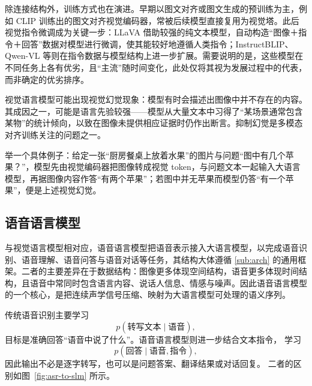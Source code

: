 除连接结构外，训练方式也在演进。早期以图文对齐或图文生成的预训练为主，例如 CLIP\cite{clip} 训练出的图文对齐视觉编码器，常被后续模型直接复用为视觉塔。此后视觉指令微调成为关键一步：LLaVA 借助较强的纯文本模型，自动构造“图像＋指令＋回答”数据对模型进行微调，使其能较好地遵循人类指令；InstructBLIP\cite{instructblip}、Qwen-VL\cite{qwenvl} 等则在指令数据与模型结构上进一步扩展。需要说明的是，这些模型在不同任务上各有优劣，且“主流”随时间变化，此处仅将其视为发展过程中的代表，而非确定的优劣排序。

\begin{importantnote}
  视觉语言模型可能出现视觉幻觉现象：模型有时会描述出图像中并不存在的内容。其成因之一，可能是语言先验较强——模型从大量文本中习得了“某场景通常包含某物”的统计倾向，以致在图像未提供相应证据时仍作出断言。抑制幻觉是多模态对齐训练关注的问题之一。
\end{importantnote}

举一个具体例子：给定一张“厨房餐桌上放着水果”的图片与问题“图中有几个苹果？”，模型先由视觉编码器把图像转成视觉 token，与问题文本一起输入大语言模型，再据图像内容作答“有两个苹果”；若图中并无苹果而模型仍答“有一个苹果”，便是上述视觉幻觉。

\subsection{语音语言模型}
\label{sub:slm}

与视觉语言模型相对应，语音语言模型把语音表示接入大语言模型，以完成语音识别、语音理解、语音问答与语音对话等任务，其结构大体遵循 \ref{sub:arch} 的通用框架。二者的主要差异在于数据结构：图像更多体现空间结构，语音更多体现时间结构，且语音中常同时包含语言内容、说话人信息、情感与噪声。因此语音语言模型的一个核心，是把连续声学信号压缩、映射为大语言模型可处理的语义序列。


传统语音识别主要学习
\[
p(\text{转写文本}\mid\text{语音}),
\]
目标是准确回答“语音中说了什么”。语音语言模型则进一步结合文本指令，
学习
\[
p(\text{回答}\mid\text{语音},\text{指令}),
\]
因此输出不必是逐字转写，也可以是问题答案、翻译结果或对话回复。
二者的区别如图~\ref{fig:asr-to-slm} 所示。

